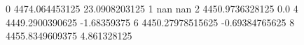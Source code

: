 0 4474.064453125 23.0908203125
1 nan nan
2 4450.9736328125 0.0
4 4449.2900390625 -1.68359375
6 4450.27978515625 -0.69384765625
8 4455.8349609375 4.861328125
